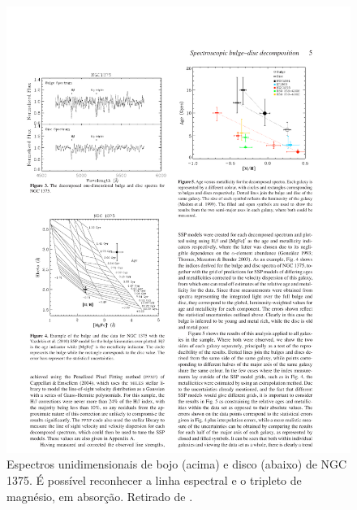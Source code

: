 \begin{figure}
	\includegraphics{figuras/johnston-spectra}
	\caption[Espectros das componentes morfológicas] {Espectros unidimensionais de
	bojo (acima) e disco (abaixo) de NGC 1375. É possível reconhecer a
	linha espectral \Hbeta e o tripleto de magnésio, em absorção. Retirado de
	\citet{Johnston2012}.}
	\label{fig:spectraJohnston}
\end{figure}

